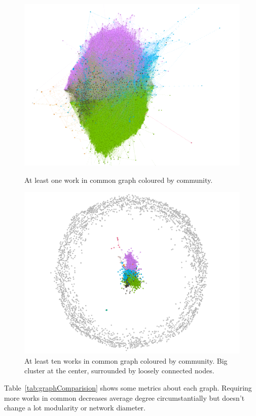 \begin{figure}[!hbt]
	\begin{center}
	\includegraphics[width=\columnwidth]{graphics/atLeast1WorkCommunity.png}
	\caption{At least one work in common graph coloured by community.}
	\label{fig:graph1CommunityColoured}

	\includegraphics[width=\columnwidth]{graphics/atLeast10WorksCommunity.png}
	\caption{At least ten works in common graph coloured by community. Big cluster at the center, surrounded by loosely connected nodes.}
	\label{fig:graph10CommunityColoured}
	\end{center}
\end{figure}

Table~\ref{tab:graphComparision} shows some metrics about each graph. Requiring more works in common decreases average degree circumstantially but doesn't change a lot modularity or network diameter.

